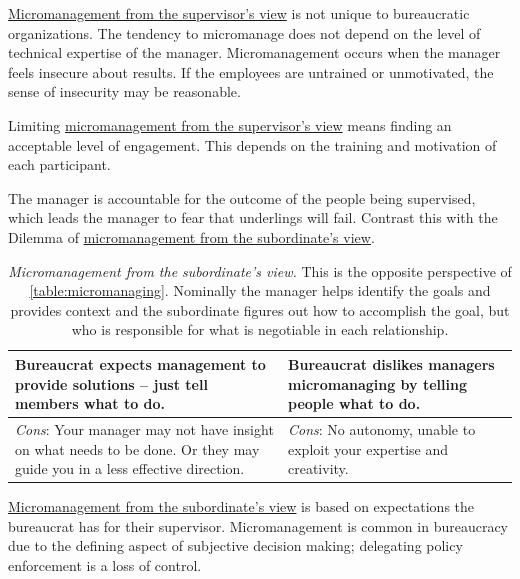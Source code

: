 \href{table:micromanaging}{Micromanagement from the supervisor's view} is not unique to bureaucratic organizations. The tendency to micromanage does not depend on the level of technical expertise of the manager. Micromanagement occurs when the manager feels insecure about results. If the employees are untrained or unmotivated, the sense of insecurity may be reasonable.

Limiting \href{table:micromanaging}{micromanagement from the supervisor's view} means finding an acceptable level of engagement. This depends on the training and motivation of each participant. 

The manager is accountable for the outcome of the people being supervised, which leads the manager to fear that underlings will fail.  Contrast this with the Dilemma of  \hyperref[table:solution-provider]{micromanagement from the subordinate’s view}.

\begin{center}
\begin{table}[H] %
\begin{tabular}{ | m{\dilemmatablewidth}| m{\dilemmatablewidth} | } 
  \hline
  \textbf{Bureaucrat expects management to provide solutions -- just tell members what to do.} & 
  \textbf{Bureaucrat dislikes managers micromanaging by telling people what to do.} \\ 
  \hline
  \textit{Cons}: Your manager may not have insight on what needs to be done. Or they may guide you in a less effective direction. &
  \textit{Cons}: No autonomy, unable to exploit your expertise and creativity. \\  
  \hline
\end{tabular}
\caption{\textit{Micromanagement from the subordinate's view.}
This is the opposite perspective of \ref{table:micromanaging}. Nominally the manager helps identify the goals and provides context and the subordinate figures out how to accomplish the goal, but who is responsible for what is negotiable in each relationship.
}
\label{table:solution-provider}
\end{table}
\end{center}

\href{table:solution-provider}{Micromanagement from the subordinate's view} is based on expectations the bureaucrat has for their supervisor. Micromanagement is common in bureaucracy due to the defining aspect of subjective decision making; delegating policy enforcement is a loss of control. 


